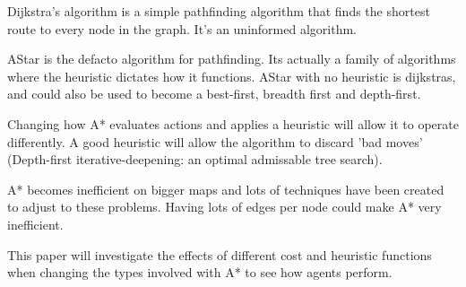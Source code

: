 \documentclass[10pt, twocolumn]{article}
\begin{document}
Dijkstra's algorithm is a simple pathfinding algorithm that finds the shortest route to every node in the graph. It's an uninformed algorithm.

AStar is the defacto algorithm for pathfinding. Its actually a family of algorithms where the heuristic dictates how it functions. AStar with no heuristic is dijkstras, and could also be used to become a best-first, breadth first and depth-first.

Changing how A* evaluates actions and applies a heuristic will allow it to operate differently. A good heuristic will allow the algorithm to discard 'bad moves' (Depth-first iterative-deepening: an optimal admissable tree search).

A* becomes inefficient on bigger maps and lots of techniques have been created to adjust to these problems. Having lots of edges per node could make A* very inefficient.

This paper will investigate the effects of different cost and heuristic functions when changing the types involved with A* to see how agents perform.

\printbibliography
\end{document}
